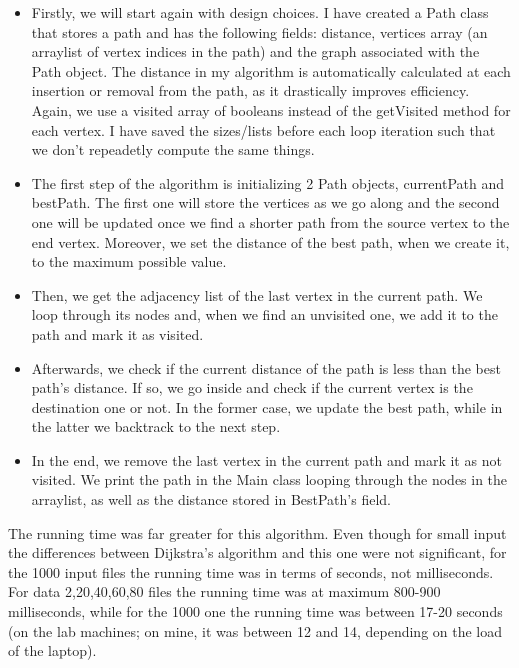 \documentclass{article}
\begin{document}
\begin{itemize}
\begin{itemize}
\item Firstly, we will start again with design choices. I have created
  a Path class that stores a path and has the following fields:
  distance, vertices array (an arraylist of vertex indices in the path) and the
  graph associated with the Path object. The distance in my algorithm
  is automatically calculated at each insertion or removal from the path, as it
  drastically improves efficiency. Again, we use a visited array of
  booleans instead of the getVisited method for each vertex. I have
  saved the sizes/lists before each loop iteration such that we don't
  repeadetly compute the same things. 
\item The first step of the algorithm is initializing 2 Path objects,
  currentPath and bestPath. The first one will store the vertices as
  we go along and the second one will be updated once we find a
  shorter path from the source vertex to the end vertex. Moreover, we
  set the distance of the best path, when we create it, to the maximum
  possible value.
\item Then, we get the adjacency list of the last vertex in the
  current path. We loop through its nodes and, when we find an
  unvisited one, we add it to the path and mark it as visited.
\item Afterwards, we check if the current distance of the path is
  less than the best path's distance. If so, we go inside and check if
  the current vertex is the destination one or not. In the former
  case, we update the best path, while in the latter we backtrack to
  the next step.
\item In the end, we remove the last vertex in the current path and
  mark it as not visited. We print the path in the Main class looping
  through the nodes in the arraylist, as well as the distance stored
  in BestPath's field.
\end{itemize}
The running time was far greater for this algorithm. Even though for
small input the differences between Dijkstra's algorithm and this one
were not significant, for the 1000 input files the running
time was in terms of seconds, not milliseconds. For data 2,20,40,60,80
files the running time was at maximum 800-900 milliseconds, while for
the 1000 one the running time was between 17-20 seconds (on the lab
machines; on mine, it was between 12 and 14, depending on the load of
the laptop). 

\end{itemize}
\end{document}
